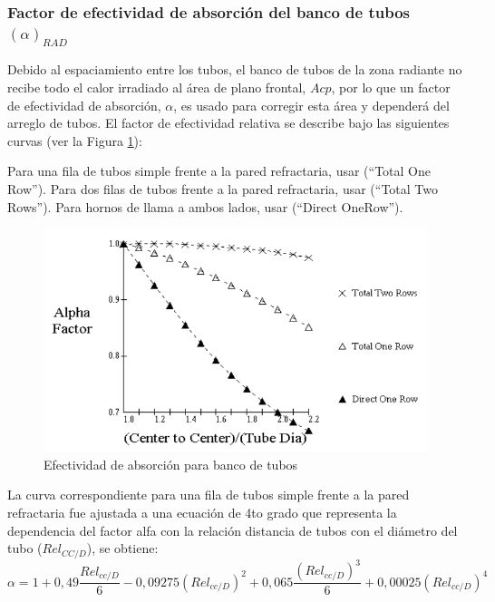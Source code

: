 \subsubsection{Factor de efectividad de absorción del banco de tubos $(\alpha)_{RAD}$}
\par Debido al espaciamiento entre los tubos, el banco de tubos de la zona radiante no recibe todo el calor irradiado al área de plano frontal, $Acp$, por lo que un factor de efectividad de absorción, $\alpha$, es usado para corregir esta área y dependerá del arreglo de tubos. El factor de efectividad relativa se describe bajo las siguientes curvas (ver la Figura \ref{fig:alpha}):
\par Para una fila de tubos simple frente a la pared refractaria, usar (``Total One Row''). Para dos filas de tubos frente a la pared refractaria, usar (``Total Two Rows''). Para hornos de llama a ambos lados, usar (``Direct OneRow'').
\begin{figure}[H]
\begin{center}
\includegraphics[scale=0.45]{images/alpha}
\caption[Efectividad de absorción para banco de tubos]{Efectividad de absorción para banco de tubos \cite{bib:mekler}}
\label{fig:alpha}
\end{center}
\end{figure}
\par La curva correspondiente para una fila de tubos simple frente a la pared refractaria fue ajustada a una ecuación de 4to grado que representa la dependencia del factor alfa con la relación distancia de tubos con el diámetro del tubo ($Rel_{CC/D}$), se obtiene:
\begin{equation}
    \alpha = 1 + 0,49\frac{Rel_{cc/D}}{6} -0,09275(Rel_{cc/D})^2 +
     0,065\frac{(Rel_{cc/D})^3}{6} + 0,00025(Rel_{cc/D})^4
\end{equation}

